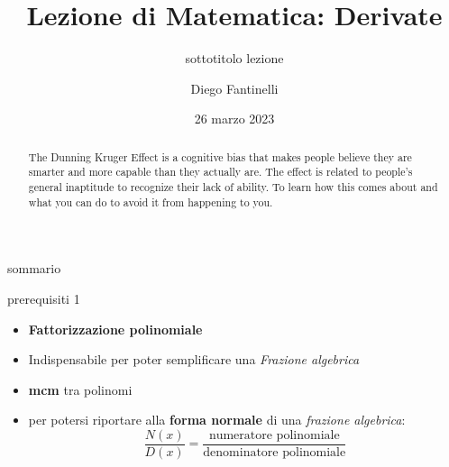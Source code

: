 \documentclass[aspectratio=169]{beamer}
\title{Lezione di Matematica: Derivate}
\subtitle{sottotitolo lezione}
\date{26 marzo 2023}
\author{Diego Fantinelli}
\institute{Matematica per il Liceo}
\begin{document}

\begin{frame}
	\titlepage
\end{frame}

\begin{frame}
    
    \begin{abstract}
        The Dunning Kruger Effect is a cognitive bias that makes people believe
        they are smarter and more capable than they actually are. The effect is
        related to people's general inaptitude to recognize their lack of
        ability. To learn how this comes about and what you can do to avoid it
        from happening to you.
    \end{abstract}
\end{frame}

\begin{frame}{sommario}
  \tableofcontents
\end{frame}








\begin{frame}{prerequisiti 1}
\begin{itemize}
\item
  \textbf{Fattorizzazione polinomiale}
\item
  Indispensabile per poter semplificare una \emph{Frazione algebrica}
\item
  \textbf{mcm} tra polinomi
\item
  per potersi riportare alla \textbf{forma normale} di una
  \emph{frazione algebrica}: \[\dfrac{N(x)}{D(x)} = \dfrac{\text{numeratore polinomiale}}{\text{denominatore polinomiale}}\]
\end{itemize}
\end{frame}
\end{document}
